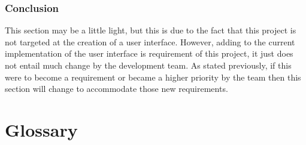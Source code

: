 \documentclass[onecolumn, draftclsnofoot,10pt, compsoc]{IEEEtran}
\begin{document}
\subsubsection{Conclusion}
This section may be a little light, but this is due to the fact that this project is not targeted at the creation of a user interface. However, adding to the current implementation of the user interface is requirement of this project, it just does not entail much change by the development team. As stated previously, if this were to become a requirement or became a higher priority by the team then this section will change to accommodate those new requirements. 

\newpage
\section{Glossary}
\printglossary[style=mylong]

\newpage
\nocite{*}


\end{document}
